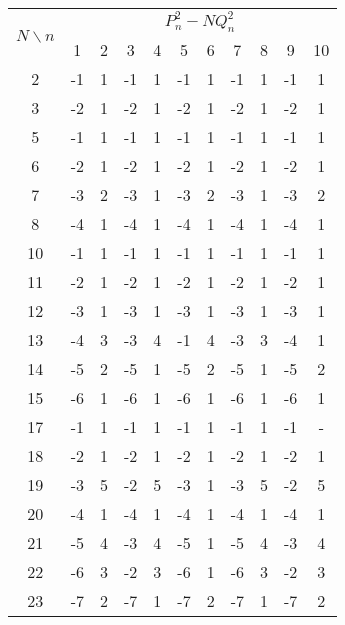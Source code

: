 \documentclass{article}
\begin{document}
\begin{table}[hp]
\begin{center}
\begin{tabular}{|c|cccccccccc|}
\hline
\multirow{2}{*}{$N\backslash n$} & \multicolumn{10}{c|}{$P_n^2-NQ_n^2$}                            \\ \cline{2-11} 
                   & 1   & 2 & 3   & 4 & 5   & 6 & 7   & 8 & 9   & 10     \\ \hline
2                  & -1  & 1 & -1  & 1 & -1  & 1 & -1  & 1 & -1  & 1      \\
3                  & -2  & 1 & -2  & 1 & -2  & 1 & -2  & 1 & -2  & 1      \\
5                  & -1  & 1 & -1  & 1 & -1  & 1 & -1  & 1 & -1  & 1      \\
6                  & -2  & 1 & -2  & 1 & -2  & 1 & -2  & 1 & -2  & 1      \\
7                  & -3  & 2 & -3  & 1 & -3  & 2 & -3  & 1 & -3  & 2      \\
8                  & -4  & 1 & -4  & 1 & -4  & 1 & -4  & 1 & -4  & 1      \\
10                 & -1  & 1 & -1  & 1 & -1  & 1 & -1  & 1 & -1  & 1      \\
11                 & -2  & 1 & -2  & 1 & -2  & 1 & -2  & 1 & -2  & 1      \\
12                 & -3  & 1 & -3  & 1 & -3  & 1 & -3  & 1 & -3  & 1      \\
13                 & -4  & 3 & -3  & 4 & -1  & 4 & -3  & 3 & -4  & 1      \\
14                 & -5  & 2 & -5  & 1 & -5  & 2 & -5  & 1 & -5  & 2      \\
15                 & -6  & 1 & -6  & 1 & -6  & 1 & -6  & 1 & -6  & 1      \\
17                 & -1  & 1 & -1  & 1 & -1  & 1 & -1  & 1 & -1  & -      \\
18                 & -2  & 1 & -2  & 1 & -2  & 1 & -2  & 1 & -2  & 1      \\
19                 & -3  & 5 & -2  & 5 & -3  & 1 & -3  & 5 & -2  & 5      \\
20                 & -4  & 1 & -4  & 1 & -4  & 1 & -4  & 1 & -4  & 1      \\
21                 & -5  & 4 & -3  & 4 & -5  & 1 & -5  & 4 & -3  & 4      \\
22                 & -6  & 3 & -2  & 3 & -6  & 1 & -6  & 3 & -2  & 3      \\
23                 & -7  & 2 & -7  & 1 & -7  & 2 & -7  & 1 & -7  & 2      \\

\end{tabular}
\end{center}
\end{table}
\end{document}

